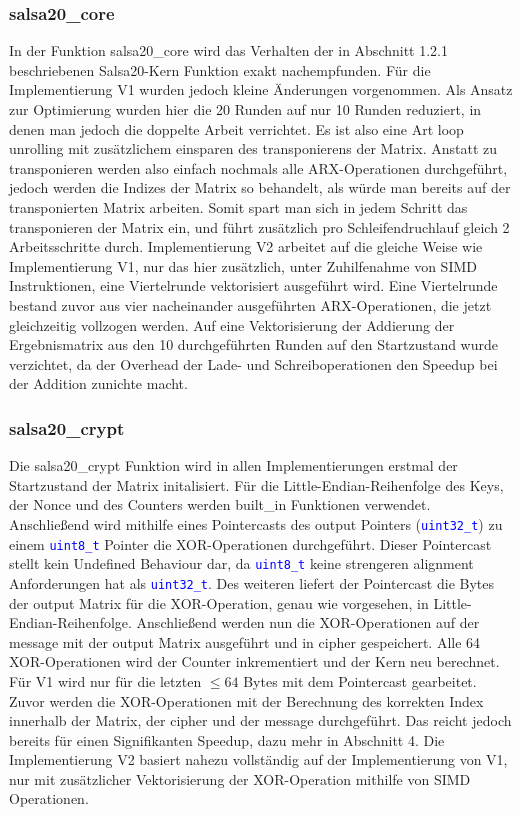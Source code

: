 \documentclass[course=erap]{aspdoc}
\begin{document}
\subsubsection{salsa20\_core}
In der Funktion salsa20\_core wird das Verhalten der in Abschnitt 1.2.1 beschriebenen Salsa20-Kern Funktion exakt nachempfunden. Für die Implementierung V1 wurden jedoch kleine Änderungen vorgenommen.
Als Ansatz zur Optimierung wurden hier die 20 Runden auf nur 10 Runden reduziert, in denen man jedoch die doppelte Arbeit verrichtet. Es ist also eine Art loop unrolling mit zusätzlichem einsparen des 
transponierens der Matrix. Anstatt zu transponieren werden also einfach nochmals alle ARX-Operationen durchgeführt, jedoch werden die Indizes der Matrix so behandelt, als würde man bereits auf
der transponierten Matrix arbeiten. Somit spart man sich in jedem Schritt das transponieren der Matrix ein, und führt zusätzlich pro Schleifendruchlauf gleich 2 Arbeitsschritte durch. Implementierung V2
arbeitet auf die gleiche Weise wie Implementierung V1, nur das hier zusätzlich, unter Zuhilfenahme von SIMD Instruktionen, eine Viertelrunde vektorisiert ausgeführt wird. Eine Viertelrunde bestand zuvor 
aus vier nacheinander ausgeführten ARX-Operationen, die jetzt gleichzeitig vollzogen werden. Auf eine Vektorisierung der Addierung der Ergebnismatrix aus den 10 durchgeführten Runden auf den Startzustand wurde verzichtet,
da der Overhead der Lade- und Schreiboperationen den Speedup bei der Addition zunichte macht.

\subsubsection{salsa20\_crypt}
Die salsa20\_crypt Funktion wird in allen Implementierungen erstmal der Startzustand der Matrix initalisiert. Für die Little-Endian-Reihenfolge des Keys, der Nonce und des Counters werden built\_in Funktionen verwendet.
Anschließend wird mithilfe eines Pointercasts des output Pointers (\texttt{\textcolor{blue}{uint32\_t}}) zu einem \texttt{\textcolor{blue}{uint8\_t}} Pointer die XOR-Operationen durchgeführt. Dieser Pointercast stellt kein Undefined Behaviour dar, 
da \texttt{\textcolor{blue}{uint8\_t}} keine strengeren alignment Anforderungen hat als \texttt{\textcolor{blue}{uint32\_t}}. Des weiteren liefert der Pointercast die Bytes der output Matrix für die XOR-Operation, genau wie vorgesehen, in Little-Endian-Reihenfolge.
Anschließend werden nun die XOR-Operationen auf der message mit der output Matrix ausgeführt und in cipher gespeichert. Alle 64 XOR-Operationen wird der Counter inkrementiert und der Kern neu berechnet. Für V1 wird nur für die letzten $\leq 64$ Bytes mit dem Pointercast gearbeitet.
Zuvor werden die XOR-Operationen mit der Berechnung des korrekten Index innerhalb der Matrix, der cipher und der message durchgeführt. Das reicht jedoch bereits für einen Signifikanten Speedup, dazu mehr in Abschnitt 4.
Die Implementierung V2 basiert nahezu vollständig auf der Implementierung von V1, nur mit zusätzlicher Vektorisierung der XOR-Operation mithilfe von SIMD Operationen.
\end{document}
